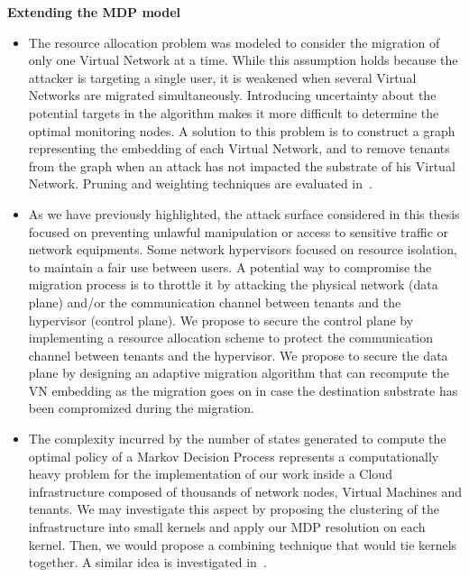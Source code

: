\textbf{Extending the MDP model}
\begin{itemize}
    \item 
    The resource allocation problem was modeled to consider the migration of only one Virtual Network at a time. While this assumption holds because the attacker is targeting a single user, it is weakened when several Virtual Networks are migrated simultaneously. Introducing uncertainty about the potential targets in the algorithm makes it more difficult to determine the optimal monitoring nodes. A solution to this problem is to construct a graph representing the embedding of each Virtual Network, and to remove tenants from the graph when an attack has not impacted the substrate of his Virtual Network. Pruning and weighting techniques are evaluated in~\cite{pruning-secu}.

    \item 
    As we have previously highlighted, the attack surface considered in this thesis focused on preventing unlawful manipulation or access to sensitive traffic or network equipments. Some network hypervisors focused on resource isolation, to maintain a fair use between users. A potential way to compromise the migration process is to throttle it by attacking the physical network (data plane) and/or the communication channel between tenants and the hypervisor (control plane). We propose to secure the control plane by implementing a resource allocation scheme to protect the communication channel between tenants and the hypervisor. We propose to secure the data plane by designing an adaptive migration algorithm that can recompute the VN embedding as the migration goes on in case the destination substrate has been compromized during the migration. 

    \item 
    The complexity incurred by the number of states generated to compute the optimal policy of a Markov Decision Process represents a computationally heavy problem for the implementation of our work inside a Cloud infrastructure composed of thousands of network nodes, Virtual Machines and tenants. We may investigate this aspect by proposing the clustering of the infrastructure into small kernels and apply our MDP resolution on each kernel. Then, we would propose a combining technique that would tie kernels together. A similar idea is investigated in~\cite{POMDP-clustering}.


\end{itemize}
